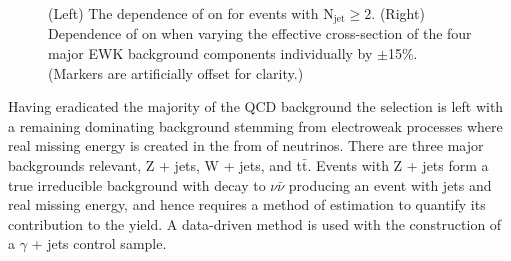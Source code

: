 \begin{figure}[htbp]
  \begin{center}
      \caption{\label{fig:rat_vs_ht} (Left) The dependence of \RaT on
      \HT for events with N$_{\mathrm{jet}} \geq 2$. (Right) Dependence of \RaT on
      \HT when varying the effective cross-section of the four major
      EWK background components individually by $\pm$15\%. (Markers
      are artificially offset for clarity.) }
  \end{center}
\end{figure}

Having eradicated the majority of the QCD background the selection is left with a remaining dominating background stemming from electroweak processes where real missing energy is created in the from of neutrinos. There are three major backgrounds relevant, Z + jets, W + jets, and t$\bar{\textrm{t}}$. Events with Z + jets form a true irreducible background with decay to $\nu \bar{\nu}$ producing an event with jets and real missing energy, and hence requires a method of estimation to quantify its contribution to the yield. A data-driven method is used with the construction of a $\gamma$ + jets control sample.

